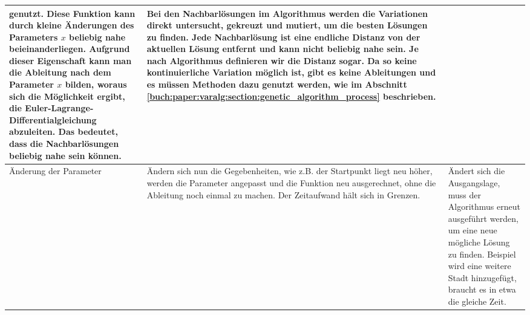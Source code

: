 \begin{xltabular}{\textwidth}{|L|X|X|}
    genutzt. Diese Funktion kann durch kleine Änderungen des Parameters \(x\) beliebig
    nahe beieinanderliegen. Aufgrund dieser Eigenschaft kann man die Ableitung nach dem
    Parameter \(x\) bilden, woraus sich die Möglichkeit ergibt, die Euler-Lagrange-Differentialgleichung
    abzuleiten. Das bedeutet, dass die Nachbarlösungen beliebig nahe sein können.  
    & 
    Bei den Nachbarlösungen im Algorithmus werden die Variationen direkt untersucht,
    gekreuzt und mutiert, um die besten Lösungen zu finden. Jede Nachbarlösung 
    ist eine endliche Distanz von der aktuellen Lösung entfernt und kann nicht beliebig 
    nahe sein. Je nach Algorithmus definieren wir die Distanz sogar.
    Da so keine kontinuierliche Variation möglich ist, gibt es keine Ableitungen
    und es müssen Methoden dazu genutzt werden, wie im Abschnitt 
    \ref{buch:paper:varalg:section:genetic_algorithm_process} beschrieben.
    \\ \hline
    Änderung der Parameter
    & 
    Ändern sich nun die Gegebenheiten, wie z.B. der Startpunkt liegt neu höher, werden die Parameter 
    angepasst und die Funktion neu ausgerechnet, ohne die Ableitung noch einmal zu machen. Der Zeitaufwand
    hält sich in Grenzen.
    & 
    Ändert sich die Ausgangslage, muss der Algorithmus erneut ausgeführt werden, um eine
    neue mögliche Lösung zu finden. Beispiel wird eine weitere Stadt hinzugefügt, braucht
    es in etwa die gleiche Zeit.
    \\ \hline
\end{xltabular}